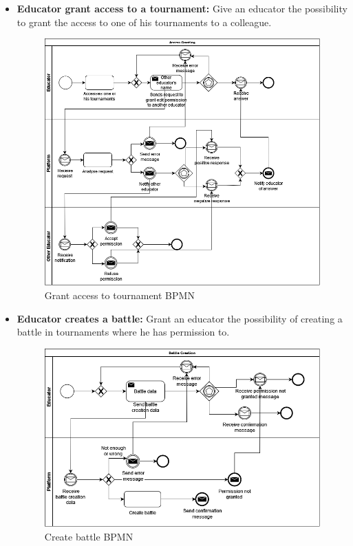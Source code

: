 \documentclass{article}
\begin{document}
{\begin{itemize}
            \item \textbf{Educator grant access to a tournament:} Give an educator the possibility to grant the access to one of his tournaments to a colleague.
            \begin{figure}[H]
                \centering
                \includegraphics[scale=0.4]{images/BPMN/GrantAccess.png}
                \caption{Grant access to tournament BPMN}
                \label{fig:accessGrantTournamentBPMN}
            \end{figure}

            \item \textbf{Educator creates a battle:} Grant an educator the possibility of creating a battle in tournaments where he has permission to.
            \begin{figure}[H]
                \centering
                \includegraphics[scale=0.4]{images/BPMN/BattleCreation.png}
                \caption{Create battle BPMN}
                \label{fig:createBattleBPMN}
            \end{figure}


\end{itemize}}
\end{document}
